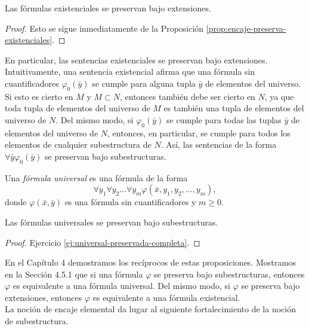 \message{ !name(main.tex)}\documentclass[12pt,a4paper]{book}
\begin{document}
    \begin{proposicion}\label{prop:existencial-preservada-extensiones}
        Las fórmulas existenciales se preservan bajo extensiones.
    \end{proposicion}
    \begin{proof}
        Esto se sigue inmediatamente de la Proposición \ref{prop:encaje-preserva-existenciales}.
    \end{proof}

    En particular, las sentencias existenciales se preservan bajo extensiones. Intuitivamente, una sentencia existencial
    afirma que una fórmula sin cuantificadores $\varphi_{0}(\bar{y})$ se cumple para alguna tupla $\bar{y}$ de elementos
    del universo. Si esto es cierto en $M$ y $M\subset N$, entonces también debe ser cierto en $N$, ya que toda tupla de
    elementos del universo de $M$ es también una tupla de elementos del universo de $N$. Del mismo modo, si
    $\varphi_{0}(\bar{y})$ se cumple para todas las tuplas $\bar{y}$ de elementos del universo de $N$, entonces, en
    particular, se cumple para todos los elementos de cualquier subestructura de $N$. Así, las sentencias de la forma
    $\forall\bar{y}\varphi_{0}(\bar{y})$ se preservan bajo subestructuras.

    \begin{definicion}\label{def:formula-universal}
        Una \textit{fórmula universal} es una fórmula de la forma
        \begin{equation*}
            \forall y_{1}\forall y_{2}\dots\forall y_{m}\varphi(\bar{x},y_{1},y_{2},\dots,y_{m}),
        \end{equation*}
        donde $\varphi(\bar{x},\bar{y})$ es una fórmula sin cuantificadores y $m\geq 0$.
    \end{definicion}

    \begin{proposicion}\label{prop:universal-preservada-subestructuras}
        Las fórmulas universales se preservan bajo subestructuras.
    \end{proposicion}
    \begin{proof}
        Ejercicio \ref{ej:universal-preservada-completa}.
    \end{proof}

    En el Capítulo 4 demostramos los recíprocos de estas proposiciones. Mostramos en la Sección 4.5.1 que si una fórmula
    $\varphi$ se preserva bajo subestructuras, entonces $\varphi$ es equivalente a una fórmula universal. Del mismo modo,
    si $\varphi$ se preserva bajo extensiones, entonces $\varphi$ es equivalente a una fórmula existencial.\\
    La noción de encaje elemental da lugar al siguiente fortalecimiento de la noción de subestructura.
\end{document}
